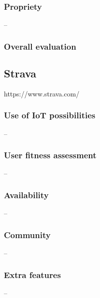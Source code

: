 \subsubsection*{Propriety} -- 
\subsubsection*{Overall evaluation}
\subsection{Strava}
https://www.strava.com/
\subsubsection*{Use of IoT possibilities} --
\subsubsection*{User fitness assessment} --
\subsubsection*{Availability} --
\subsubsection*{Community} -- 
\subsubsection*{Extra features} -- 
